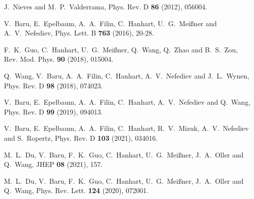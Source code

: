 \documentclass[preprint,12pt,3p]{elsarticle}
\begin{document}
\begin{thebibliography}{99}
J.~Nieves and M.~P.~Valderrama,
Phys. Rev. D \textbf{86} (2012), 056004.

V.~Baru, E.~Epelbaum, A.~A.~Filin, C.~Hanhart, U.~G.~Mei\ss{}ner and A.~V.~Nefediev,
Phys. Lett. B \textbf{763} (2016), 20-28.

F.~K.~Guo, C.~Hanhart, U.~G.~Mei\ss{}ner, Q.~Wang, Q.~Zhao and B.~S.~Zou,
Rev. Mod. Phys. \textbf{90} (2018), 015004.

Q.~Wang, V.~Baru, A.~A.~Filin, C.~Hanhart, A.~V.~Nefediev and J.~L.~Wynen,
Phys. Rev. D \textbf{98} (2018), 074023.

V.~Baru, E.~Epelbaum, A.~A.~Filin, C.~Hanhart, A.~V.~Nefediev and Q.~Wang,
Phys. Rev. D \textbf{99} (2019), 094013.

V.~Baru, E.~Epelbaum, A.~A.~Filin, C.~Hanhart, R.~V.~Mizuk, A.~V.~Nefediev and S.~Ropertz,
Phys. Rev. D \textbf{103} (2021), 034016.

M.~L.~Du, V.~Baru, F.~K.~Guo, C.~Hanhart, U.~G.~Mei\ss{}ner, J.~A.~Oller and Q.~Wang,
JHEP \textbf{08} (2021), 157.

M.~L.~Du, V.~Baru, F.~K.~Guo, C.~Hanhart, U.~G.~Mei\ss{}ner, J.~A.~Oller and Q.~Wang,
Phys. Rev. Lett. \textbf{124} (2020), 072001.


\end{thebibliography}
\end{document}
